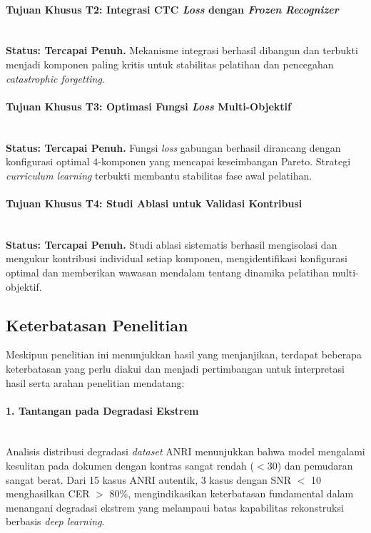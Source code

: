 \documentclass[12pt,a4paper]{article}
\begin{document}
\paragraph{Tujuan Khusus T2: Integrasi CTC \textit{Loss} dengan \textit{Frozen Recognizer}} \mbox{}\\[0.1em]
\textbf{Status: Tercapai Penuh.} Mekanisme integrasi berhasil dibangun dan terbukti menjadi komponen paling kritis untuk stabilitas pelatihan dan pencegahan \textit{catastrophic forgetting}.

\paragraph{Tujuan Khusus T3: Optimasi Fungsi \textit{Loss} Multi-Objektif} \mbox{}\\[0.1em]
\textbf{Status: Tercapai Penuh.} Fungsi \textit{loss} gabungan berhasil dirancang dengan konfigurasi optimal 4-komponen yang mencapai keseimbangan Pareto. Strategi \textit{curriculum learning} terbukti membantu stabilitas fase awal pelatihan.

\paragraph{Tujuan Khusus T4: Studi Ablasi untuk Validasi Kontribusi} \mbox{}\\[0.1em]
\textbf{Status: Tercapai Penuh.} Studi ablasi sistematis berhasil mengisolasi dan mengukur kontribusi individual setiap komponen, mengidentifikasi konfigurasi optimal dan memberikan wawasan mendalam tentang dinamika pelatihan multi-objektif.

\vspace{0.8em}

\subsection{Keterbatasan Penelitian}
\label{subsec:keterbatasan}
\vspace{0.8em}

Meskipun penelitian ini menunjukkan hasil yang menjanjikan, terdapat beberapa keterbatasan yang perlu diakui dan menjadi pertimbangan untuk interpretasi hasil serta arahan penelitian mendatang:

\paragraph{1. Tantangan pada Degradasi Ekstrem} \mbox{}\\[0.1em]
Analisis distribusi degradasi \textit{dataset} ANRI menunjukkan bahwa model mengalami kesulitan pada dokumen dengan kontras sangat rendah ($<$30) dan pemudaran sangat berat. Dari 15 kasus ANRI autentik, 3 kasus dengan SNR $<$ 10 menghasilkan CER $>$ 80\%, mengindikasikan keterbatasan fundamental dalam menangani degradasi ekstrem yang melampaui batas kapabilitas rekonstruksi berbasis \textit{deep learning}.
\end{document}
